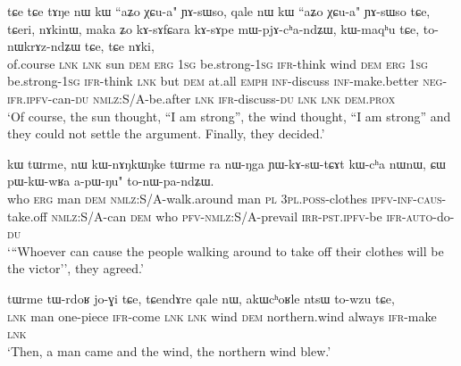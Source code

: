 \documentclass[12pt]{article}
\newcommand{\ipab}[1]{{\phon#1}}
\newcommand{\gltt}{ \vspace{-1em}  \glt}
\begin{document}
\begin{myexe} 
\gll  \ipab{lɯski} \ipab{tɕe} \ipab{tɕe} \ipab{tɤŋe} \ipab{nɯ} \ipab{kɯ} \ipab{``aʑo} \ipab{χɕu-a"} \ipab{ɲɤ-sɯso,} \ipab{qale} \ipab{nɯ} \ipab{kɯ} \ipab{``aʑo}  \ipab{χɕu-a"} \ipab{ɲɤ-sɯso} \ipab{tɕe,} \ipab{tɕeri,} \ipab{nɤkinɯ,} \ipab{maka} \ipab{ʑo} \ipab{kɤ-sɤfɕara} \ipab{kɤ-sɤpe} \ipab{mɯ-pjɤ-cʰa-ndʑɯ,} \ipab{kɯ-maqʰu} \ipab{tɕe,} \ipab{to-nɯkrɤz-ndʑɯ} \ipab{tɕe,} \ipab{tɕe} \ipab{nɤki,} \\ 
 of.course \textsc{lnk} \textsc{lnk} sun    \textsc{dem} \textsc{erg} 1\textsc{sg}  be.strong-1\textsc{sg} \textsc{ifr}-think wind \textsc{dem} \textsc{erg} 1\textsc{sg}  be.strong-1\textsc{sg} \textsc{ifr}-think \textsc{lnk}  but     \textsc{dem} at.all \textsc{emph} \textsc{inf}-discuss   \textsc{inf}-make.better  \textsc{neg}-\textsc{ifr}.\textsc{ipfv}-can-\textsc{du}    \textsc{nmlz}:S/A-be.after \textsc{lnk}  \textsc{ifr}-discuss-\textsc{du}    \textsc{lnk}  \textsc{lnk} \textsc{dem}.\textsc{prox}\\ 
 \gltt  `Of course, the sun thought, ``I am strong'', the wind thought, ``I am strong'' and they could not settle the argument. Finally, they decided.'
\end{myexe} 
 
\begin{myexe} 
\gll  \ipab{``ɕɯ} \ipab{kɯ} \ipab{tɯrme,} \ipab{nɯ} \ipab{kɯ-nɤŋkɯŋke} \ipab{tɯrme} \ipab{ra} \ipab{nɯ-ŋga} \ipab{ɲɯ-kɤ-sɯ-tɕɤt}  \ipab{kɯ-cʰa} \ipab{nɯnɯ,} \ipab{ɕɯ} \ipab{pɯ-kɯ-wʁa} \ipab{a-pɯ-ŋu"} \ipab{to-nɯ-pa-ndʑɯ.} \\ 
 who  \textsc{erg} man     \textsc{dem} \textsc{nmlz}:S/A-walk.around  man    \textsc{pl}  3\textsc{pl}.\textsc{poss}-clothes \textsc{ipfv}-\textsc{inf}-\textsc{caus}-take.off  \textsc{nmlz}:S/A-can  \textsc{dem}    who \textsc{pfv}-\textsc{nmlz}:S/A-prevail \textsc{irr}-\textsc{pst}.\textsc{ipfv}-be   \textsc{ifr}-\textsc{auto}-do-\textsc{du}\\ 
 \gltt  `{``}Whoever can cause the people walking around to take off their clothes will be the victor'', they agreed.'
\end{myexe} 

 

\begin{myexe} 
\gll  \ipab{tɕendɤre} \ipab{tɯrme} \ipab{tɯ-rdoʁ} \ipab{jo-ɣi} \ipab{tɕe,} \ipab{tɕendɤre} \ipab{qale} \ipab{nɯ,} \ipab{akɯcʰoʁle} \ipab{ntsɯ} \ipab{to-wzu} \ipab{tɕe,} \\ 
 \textsc{lnk}  man    one-piece \textsc{ifr}-come \textsc{lnk}  \textsc{lnk}  wind \textsc{dem} northern.wind always  \textsc{ifr}-make \textsc{lnk} \\ 
 \gltt  `Then, a man came and the wind, the northern wind blew.'
\end{myexe} 
\end{document}
